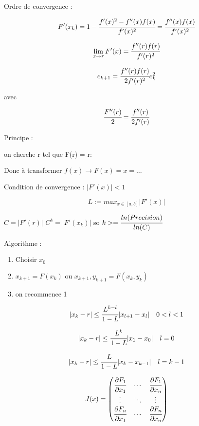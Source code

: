 Ordre de convergence :

$$ F'(x_k) = 1 - \cfrac{f'(x)^2 - f''(x)f(x)}{f'(x)^2} = \cfrac{f''(x)f(x)}{f'(x)^2}$$

$$\lim_{x \to r} F'(x) = \cfrac{f''(r)f(r)}{f'(r)^2}$$ 

$$ e_{k+1} = \cfrac{f''(r)f(r)}{2f'(r)^2} e_k^2$$ 

avec 

$$\cfrac{F''(r)}{2} = \cfrac{f''(r)}{2f'(r)}$$



Principe :

on cherche r tel que F(r) = r: 

Donc à transformer $f(x) \rightarrow F(x) = x = \dots$ 

Condition de convergence : $|F'(x)| < 1$

$$ L := max_{x \in [a,b]} |F'(x)|$$

$ C = |F'(r)|$ \quad $C^k = |F'(x_k)|$ so $k >= \cfrac{ln(Precision)}{ln(C)}$


Algorithme :

\begin{enumerate}
    \item Choisir $x_0$
    \item $x_{k+1} = F(x_k)$ ou ${x_{k+1},y_{k+1}} = F(x_k,y_k)$
    \item on recommence 1
\end{enumerate}

$$|x_{k} - r| \leq \cfrac{L^{k-l}}{1-L} |x_{l+1} - x_{l}| \quad  0 < l < 1$$


$$|x_{k} - r| \leq \cfrac{L^{k}}{1-L} |x_{1} - x_{0}| \quad  l = 0$$


$$|x_{k} - r| \leq \cfrac{L}{1-L} |x_{k} - x_{k-1}| \quad  l = k-1$$



$$J(x) = \begin{pmatrix}
    \cfrac{\partial F_1}{\partial x_1} &  \cdots & \cfrac{\partial F_1}{\partial x_n} \\
    \vdots  & \ddots & \vdots  \\
    \cfrac{\partial F_n}{\partial x_1} & \cdots & \cfrac{\partial F_n}{\partial x_n}

\end{pmatrix}$$


